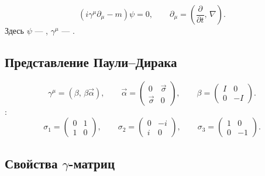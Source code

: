 \documentclass[../final.tex]{subfiles}
\begin{document}


\begin{equation*}
    \left(i\gamma^\mu\partial_\mu-m\right)\psi=0,
    \qquad
    \partial_\mu=\left(\frac{\partial}{\partial t},\,\nabla\right).
\end{equation*}
Здесь $\psi$ --- , $\gamma^\mu$ --- .

\subsection*{Представление Паули--Дирака}

\begin{equation*}
    \gamma^\mu=\left(\beta,\,\beta\vec\alpha\right),
    \qquad
    \vec\alpha=
    \begin{pmatrix}
        0&\vec\sigma\\
        \vec\sigma&0
    \end{pmatrix},
    \qquad
    \beta=
    \begin{pmatrix}
        I&0\\
        0&-I
    \end{pmatrix}.
\end{equation*}
:
\begin{equation*}
    \sigma_1=
    \begin{pmatrix}
        0&1\\
        1&0
    \end{pmatrix},
    \qquad
    \sigma_2=
    \begin{pmatrix}
        0&-i\\
        i&0
    \end{pmatrix},
    \qquad
    \sigma_3=
    \begin{pmatrix}
        1&0\\
        0&-1
    \end{pmatrix}.
\end{equation*}

\subsection*{Свойства \texorpdfstring{$\gamma$}{γ}-матриц}
\end{document}
